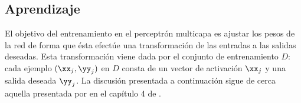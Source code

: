%
%
\subsection{Aprendizaje}
%



El objetivo del entrenamiento en el perceptrón multicapa es ajustar
los pesos de la red de forma que ésta efectúe una transformación de
las entradas a las salidas deseadas. Esta transformación viene dada
por el conjunto de entrenamiento $D$: cada ejemplo $(\xx_j,\yy_j)$ en
$D$ consta de un vector de activación $\xx_j$ y una salida deseada
$\yy_j$. La discusión presentada a continuación sigue de cerca aquella
presentada por \citeauthor{haykin} en el capítulo 4 de \cite{haykin}.


